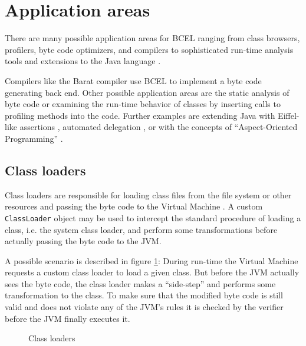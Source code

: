 \documentclass[12pt,twoside]{article}
\newcommand\jc{{\sffamily BCEL }}
\newcommand\vm{{Virtual Machine }}
\begin{document}
\section{Application areas}\label{sec:application}

There are many possible application areas for \jc ranging from class
browsers, profilers, byte code optimizers, and compilers to
sophisticated run-time analysis tools and extensions to the Java
language \cite{agesen, myers}.

Compilers like the Barat compiler  \cite{barat} use \jc to implement a
byte code  generating back end.  Other possible  application areas are
the  static  analysis   of  byte code \cite{thies}  or  examining  the
run-time behavior  of classes by inserting calls  to profiling methods
into the  code. Further examples  are extending Java  with Eiffel-like
assertions  \cite{jawa}, automated delegation  \cite{classfilters}, or
with the concepts of ``Aspect-Oriented Programming'' \cite{aspect}.

\subsection{Class loaders}\label{sec:classloaders}

Class loaders  are responsible for  loading class files from  the file
system  or  other resources  and  passing the  byte  code  to the  \vm
\cite{classloader}.  A custom  \texttt{ClassLoader} object may be used
to  intercept the  standard procedure  of  loading a  class, i.e.  the
system class loader, and  perform some transformations before actually
passing the byte code to the JVM.

A  possible  scenario is  described  in figure  \ref{fig:classloader}:
During run-time the \vm requests a custom class loader to load a given
class.  But before  the JVM  actually sees  the byte  code,  the class
loader makes  a ``side-step'' and performs some  transformation to the
class. To  make sure that  the modified byte  code is still  valid and
does not violate any of the  JVM's rules it is checked by the verifier
before the JVM finally executes it.

\begin{figure}[ht]
  \begin{center}
    \leavevmode
    \epsfxsize\textwidth
    \caption{Class loaders}\label{fig:classloader}
  \end{center}
\end{figure}
\end{document}
